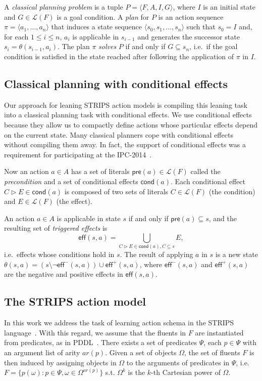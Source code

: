 \documentclass[letterpaper]{article} %
\newcommand{\tup}[1]{{\langle #1 \rangle}}
\newcommand{\pre}{\mathsf{pre}}     %
\newcommand{\eff}{\mathsf{eff}}     %
\newcommand{\cond}{\mathsf{cond}}   %
\begin{document}
A {\em classical planning problem} is a tuple $P=\tup{F,A,I,G}$, where $I$ is an initial state and $G\in\mathcal{L}(F)$ is a goal condition. A {\em plan} for $P$ is an action sequence $\pi=\tup{a_1, \ldots, a_n}$ that induces a state sequence $\tup{s_0, s_1, \ldots, s_n}$ such that $s_0=I$ and, for each {\small $1\leq i\leq n$}, $a_i$ is applicable in $s_{i-1}$ and generates the successor state $s_i=\theta(s_{i-1},a_i)$. The plan $\pi$ {\em solves} $P$ if and only if $G\subseteq s_n$, i.e.~if the goal condition is satisfied in the state reached after following the application of $\pi$ in $I$.


\subsection{Classical planning with conditional effects}
Our approach for leaning STRIPS action models is compiling this leaning task into a classical planning task with conditional effects. We use conditional effects because they allow us to compactly define actions whose particular effects depend on the current state. Many classical planners cope with conditional effects without compiling them away. In fact, the support of conditional effects was a requirement for participating at the IPC-2014~\cite{vallati:IPC:AIM2015}.

Now an action $a\in A$ has a set of literals $\pre(a)\in\mathcal{L}(F)$ called the {\em precondition} and a set of conditional effects $\cond(a)$. Each conditional effect $C\rhd E\in\cond(a)$ is composed of two sets of literals $C\in\mathcal{L}(F)$ (the condition) and $E\in\mathcal{L}(F)$ (the effect).

An action $a\in A$ is applicable in state $s$ if and only if $\pre(a)\subseteq s$, and the resulting set of {\em triggered effects} is
\[
\eff(s,a)=\bigcup_{C\rhd E\in\cond(a),C\subseteq s} E,
\]
i.e.~effects whose conditions hold in $s$. The result of applying $a$ in $s$ is a new state $\theta(s,a)=(s\setminus \neg \eff^-(s,a))\cup\eff^+(s,a)$, where $\eff^-(s,a)$ and $\eff^+(s,a)$ are the negative and positive effects in $\eff(s,a)$.


\subsection{The STRIPS action model}
In this work we address the task of learning  action  schema  in  the  STRIPS language~\cite{fikes1971strips}. With this regard, we assume that the fluents in $F$ are instantiated from predicates, as in PDDL~\cite{mcdermott1998pddl,fox2003pddl2}. There exists a set of predicates $\Psi$, each $p\in\Psi$ with an argument list of arity $ar(p)$. Given a set of objects $\Omega$, the set of fluents $F$ is then induced by assigning objects in $\Omega$ to the arguments of predicates in $\Psi$, i.e.~$F=\{p(\omega):p\in\Psi,\omega\in\Omega^{ar(p)}\}$ s.t. $\Omega^k$ is the $k$-th Cartesian power of $\Omega$.
\end{document}
